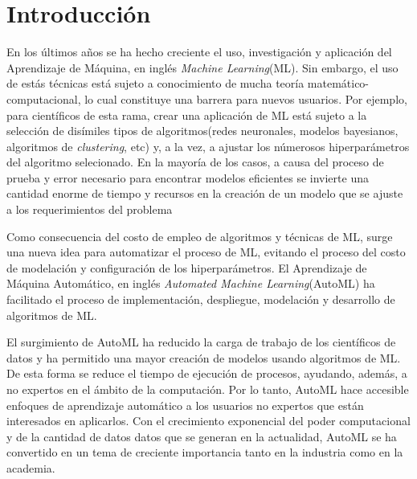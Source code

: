 \chapter*{Introducción}\label{chapter:introduction}

En los últimos años se ha hecho creciente el uso, investigación y aplicación
del Aprendizaje de Máquina, en inglés \emph{Machine Learning}(ML). Sin embargo,
el uso de estás técnicas está sujeto a conocimiento de mucha teoría
matemático-computacional, lo cual constituye una barrera para nuevos usuarios.
Por ejemplo, para científicos de esta rama, crear una aplicación de ML está
sujeto a la selección de disímiles tipos de algoritmos(redes neuronales,
modelos bayesianos, algoritmos de \emph{clustering}, etc) y, a la vez, a
ajustar los númerosos hiperparámetros del algoritmo selecionado. En la mayoría
de los casos, a causa del proceso de prueba y error necesario para encontrar
modelos eficientes se invierte una cantidad enorme de tiempo y recursos en
la creación de un modelo que se ajuste a los requerimientos del problema

Como consecuencia del costo de empleo de algoritmos y técnicas de ML, surge una
nueva idea para automatizar el proceso de ML, evitando el proceso del costo de
modelación y configuración de los hiperparámetros. El Aprendizaje de Máquina
Automático, en inglés \emph{Automated Machine Learning}(AutoML) ha facilitado
el proceso de implementación, despliegue, modelación y desarrollo de algoritmos
de ML.

El surgimiento de AutoML ha reducido la carga de trabajo de los científicos de
datos y ha permitido una mayor creación de modelos usando algoritmos de ML. De
esta forma se reduce el tiempo de ejecución de procesos, ayudando, además, a no
expertos en el ámbito de la computación. Por lo tanto, AutoML hace accesible
enfoques de aprendizaje automático a los usuarios no expertos que están
interesados en aplicarlos. Con el crecimiento exponencial del poder
computacional y de la cantidad de datos datos que se generan en la actualidad,
AutoML se ha convertido en un tema de creciente importancia tanto en la
industria como en la academia.

